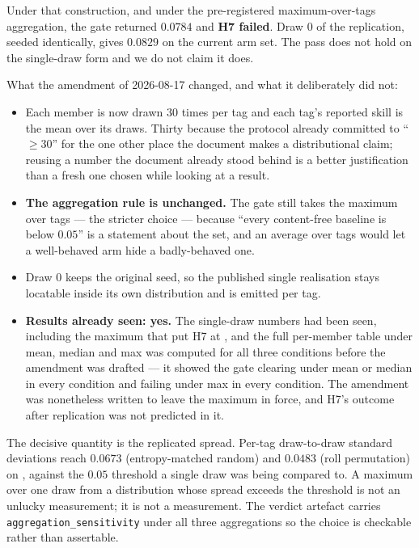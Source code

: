 \documentclass[10pt]{article}
\begin{document}
Under that construction, and under the pre-registered maximum-over-tags
aggregation, the gate returned $0.0784$ and \textbf{H7 failed}. Draw $0$ of the
replication, seeded identically, gives $0.0829$ on the current arm set. The pass
does not hold on the single-draw form and we do not claim it does.

What the amendment of 2026-08-17 changed, and what it deliberately did not:

\begin{itemize}\itemsep2pt
\item Each member is now drawn $30$ times per tag and each tag's reported skill
is the mean over its draws. Thirty because the protocol already committed to
``$\geq 30$'' for the one other place the document makes a distributional claim;
reusing a number the document already stood behind is a better justification than
a fresh one chosen while looking at a result.
\item \textbf{The aggregation rule is unchanged.} The gate still takes the
maximum over tags --- the stricter choice --- because ``every content-free
baseline is below $0.05$'' is a statement about the set, and an average over tags
would let a well-behaved arm hide a badly-behaved one.
\item Draw $0$ keeps the original seed, so the published single realisation stays
locatable inside its own distribution and is emitted per tag.
\item \textbf{Results already seen: yes.} The single-draw numbers had been seen,
including the maximum that put H7 at \FAIL{}, and the full per-member table under
mean, median and max was computed for all three conditions before the amendment
was drafted --- it showed the gate clearing under mean or median in every
condition and failing under max in every condition. The amendment was nonetheless
written to leave the maximum in force, and H7's outcome after replication was not
predicted in it.
\end{itemize}

The decisive quantity is the replicated spread. Per-tag draw-to-draw standard
deviations reach $0.0673$ (entropy-matched random) and $0.0483$ (roll
permutation) on \condA{}, against the $0.05$ threshold a single draw was being
compared to. A maximum over one draw from a distribution whose spread exceeds the
threshold is not an unlucky measurement; it is not a measurement. The verdict
artefact carries \texttt{aggregation\_sensitivity} under all three aggregations
so the choice is checkable rather than assertable.
\end{document}
